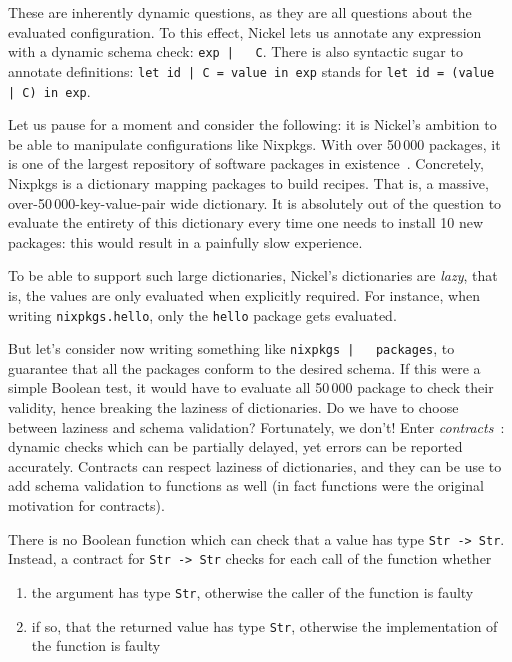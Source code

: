 \documentclass[sigplan,10pt,review,anonymous]{acmart}
\newcommand{\unsure}[2][1=]{}
\newcommand{\nickel}[1]{\lstinline[language=nickel]{#1}}
\begin{document}
These are inherently dynamic questions, as they are all questions
about the evaluated configuration. To this effect, Nickel lets us
annotate any expression with a dynamic schema check: \nickel{exp |
  C}. There is also syntactic sugar to annotate definitions:
\nickel{let id | C = value in exp} stands for \nickel{let id = (value
  | C) in exp}.\unsure{This point used to be made, do we want to
  reinsert it? However, Nickel programs are of a special kind: they are usually
simple, terminating programs that run on fixed inputs. Correctness errors will
show up at evaluation anyway, or will not matter (dead code).}

Let us pause for a moment and consider the following: it is Nickel's
ambition to be able to manipulate configurations like Nixpkgs. With
over 50\,000 packages, it is one of the largest repository of software
packages in existence~\cite{repology}. Concretely, Nixpkgs is a
dictionary mapping packages to build recipes. That is, a massive,
over-50\,000-key-value-pair wide dictionary. It is absolutely out of the
question to evaluate the entirety of this dictionary every time one
needs to install 10 new packages: this would result in a painfully
slow experience.

To be able to support such large dictionaries, Nickel's dictionaries
are \emph{lazy}, that is, the values are only evaluated when
explicitly required. For instance, when writing
\hbox{\nickel{nixpkgs.hello},} only the \nickel{hello} package gets
evaluated.

But let's consider now writing something like \nickel{nixpkgs |
  packages}, to guarantee that all the packages conform to the desired
schema. If this were a simple Boolean test, it would have to evaluate
all 50\,000 package to check their validity, hence breaking the
laziness of dictionaries. Do we have to choose between laziness and
schema validation? Fortunately, we don't! Enter
\emph{contracts}~\cite{FindlerFelleisenHOContracts}: dynamic checks
which can be partially delayed, yet errors can be reported
accurately. Contracts can respect laziness of dictionaries, and they
can be use to add schema validation to functions as well (in fact
functions were the original motivation for contracts).

There is no Boolean function which can check that a value has type
\nickel{Str -> Str}. Instead, a contract for \nickel{Str -> Str}
checks for each call of the function whether
\begin{enumerate}
\item the argument has type \nickel{Str}, otherwise the caller of the
  function is faulty
\item if so, that the returned value has type \nickel{Str}, otherwise
  the implementation of the function is faulty
\end{enumerate}
\end{document}
